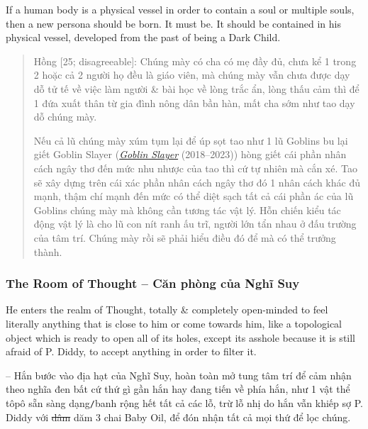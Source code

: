 \documentclass[12pt]{article}
\begin{document}
If a human body is a physical vessel in order to contain a soul or multiple souls, then a new persona should be born. It must be. It should be contained in his physical vessel, developed from the past of being a Dark Child.
\begin{quote}
	{\sf Hồng [25; disagreeable]}: Chúng mày có cha có mẹ đầy đủ, chưa kể 1 trong 2 hoặc cả 2 người họ đều là giáo viên, mà chúng mày vẫn chưa được dạy dỗ tử tế về việc làm người \& bài học về lòng trắc ẩn, lòng thấu cảm thì để 1 đứa xuất thân từ gia đình nông dân bần hàn, mất cha sớm như tao dạy dỗ chúng mày.
	
	Nếu cả lũ chúng mày xúm tụm lại để úp sọt tao như 1 lũ Goblins bu lại giết Goblin Slayer (\href{https://www.imdb.com/title/tt8690728/}{\it Goblin Slayer} (2018--2023)) hòng giết cái phần nhân cách ngây thơ đến mức nhu nhược của tao thì cứ tự nhiên mà cắn xé. Tao sẽ xây dựng trên cái xác phần nhân cách ngây thơ đó 1 nhân cách khác đủ mạnh, thậm chí mạnh đến mức có thể diệt sạch tất cả cái phần ác của lũ Goblins chúng mày mà không cần tương tác vật lý. Hỗn chiến kiểu tác động vật lý là cho lũ con nít ranh ấu trĩ, người lớn tẩn nhau ở đấu trường của tâm trí. Chúng mày rồi sẽ phải hiểu điều đó để mà có thể trưởng thành.
\end{quote}

\subsubsection{The Room of Thought -- Căn phòng của Nghĩ Suy}
He enters the realm of Thought, totally \& completely open-minded to feel literally anything that is close to him or come towards him, like a topological object which is ready to open all of its holes, except its asshole because it is still afraid of P. Diddy, to accept anything in order to filter it.

-- Hắn bước vào địa hạt của Nghĩ Suy, hoàn toàn mở tung tâm trí để cảm nhận theo nghĩa đen bất cứ thứ gì gần hắn hay đang tiến về phía hắn, như 1 vật thể tôpô sẵn sàng dạng{\tt/}banh rộng hết tất cả các lỗ, trừ lỗ nhị do hắn vẫn khiếp sợ P. Diddy với \st{dâm} dăm 3 chai Baby Oil, để đón nhận tất cả mọi thứ để lọc chúng.
\end{document}
